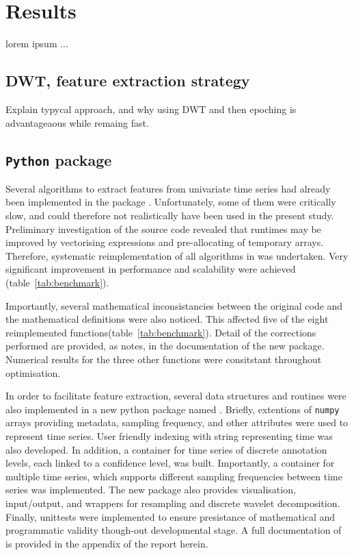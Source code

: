 \section{Results} \label{results}

lorem ipsum ...

\subsection{DWT, feature extraction strategy}
Explain typycal approach, and why using DWT and then epoching is advantageaous while remaing fast.


\subsection{\texttt{Python} package}
Several algorithms to extract features from univariate time series had already been implemented in the \py{} package \pyeeg{}\citationneeded{}.
Unfortunately, some of them were critically slow, and could therefore not realistically have been used in the present study.
Preliminary investigation of the source code revealed that runtimes may be improved by vectorising expressions and pre-allocating of temporary arrays.
Therefore, systematic reimplementation of all algorithms in \pyeeg{} was undertaken.
Very significant improvement in performance and scalability were achieved (table~\ref{tab:benchmark}).



Importantly, several mathematical inconsistancies between the original code and the mathematical definitions were also noticed.
This affected five of the eight reimplemented functions(table~\ref{tab:benchmark}). 
Detail of the corrections performed are provided, as notes, in the documentation of the new package.
Numerical results for the three other functions were consitstant throughout optimisation.

In order to facilitate feature extraction, several data structures and routines were also implemented 
in a new python package named \pr{}.
Briefly, extentions of \texttt{numpy} arrays providing metadata, sampling frequency, and other attributes were used to represent time series.
User friendly indexing with string representing time was also developed.
In addition, a container for time series of discrete annotation levels, each linked to a confidence level, was built.
Importantly, a container for multiple time series, which supports different sampling frequencies
between time series was implemented.
The new package also provides visualisation, input/output, and wrappers for resampling and discrete wavelet decomposition.
Finally, unittests were implemented to ensure presistance of mathematical and programmatic validity though-out developmental stage.
A full documentation of \pr{} is provided in the appendix of the report herein.

